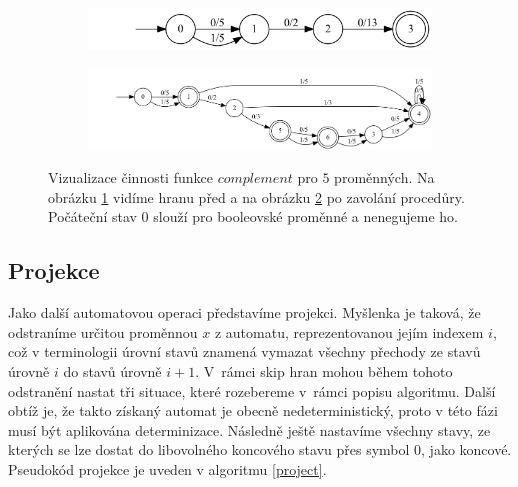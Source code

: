 \begin{figure}[h]
    \centering
    \begin{subfigure}{.38\textwidth}
        \centering
        \includegraphics[scale=0.27]{obrazky-figures/compl_img1.png}
        \caption{}
        \label{compl_img1}
    \end{subfigure}
    \hfil
    \begin{subfigure}{.59\textwidth}
        \centering
        \includegraphics[scale=0.27]{obrazky-figures/compl_img2.png}
        \caption{}
        \label{compl_img2}
    \end{subfigure}
    \caption{Vizualizace činnosti funkce $complement$ pro $5$ proměnných. Na obrázku \ref{compl_img1} vidíme hranu před a na obrázku \ref{compl_img2} po zavolání procedůry. Počáteční stav $0$ slouží pro booleovské proměnné a nenegujeme ho.}
    \label{compl_img}
\end{figure}

\subsection{Projekce}

Jako další automatovou operaci představíme projekci. Myšlenka je taková, že odstraníme určitou proměnnou $x$ z automatu, reprezentovanou jejím indexem $i$, což v terminologii úrovní stavů znamená vymazat všechny přechody ze stavů úrovně $i$ do stavů úrovně $i+1$. V~rámci skip hran mohou během tohoto odstranění nastat tři situace, které rozebereme v~rámci popisu algoritmu. Další obtíž je, že takto získaný automat je obecně nedeterministický, proto v této fázi musí být aplikována determinizace. Následně ještě  nastavíme všechny stavy, ze kterých se lze dostat do libovolného koncového stavu přes symbol $0$, jako koncové. Pseudokód projekce je uveden v algoritmu \ref{project}.

